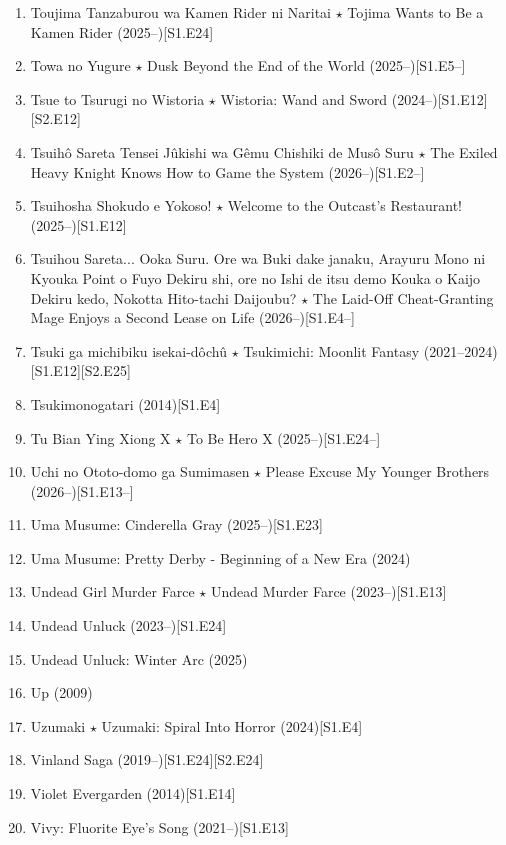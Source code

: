 \documentclass{article}
\begin{document}
\begin{enumerate}
    \item {\sc Toujima Tanzaburou wa Kamen Rider ni Naritai $\star$ Tojima Wants to Be a Kamen Rider} (2025--)\hfill[S1.E24]
    \item Towa no Yugure $\star$ Dusk Beyond the End of the World (2025--)\hfill[S1.E5--]
    \item {\sc Tsue to Tsurugi no Wistoria $\star$ Wistoria: Wand and Sword} (2024--)\hfill[S1.E12][S2.E12]
    \item Tsuihô Sareta Tensei Jûkishi wa Gêmu Chishiki de Musô Suru $\star$ The Exiled Heavy Knight Knows How to Game the System (2026--)\hfill[S1.E2--]
    \item {\sc Tsuihosha Shokudo e Yokoso! $\star$ Welcome to the Outcast's Restaurant!} (2025--)\hfill[S1.E12]
    \item Tsuihou Sareta... Ooka Suru. Ore wa Buki dake janaku, Arayuru Mono ni Kyouka Point o Fuyo Dekiru shi, ore no Ishi de itsu demo Kouka o Kaijo Dekiru kedo, Nokotta Hito-tachi Daijoubu? $\star$ The Laid-Off Cheat-Granting Mage Enjoys a Second Lease on Life (2026--)\hfill[S1.E4--]
    \item {\sc Tsuki ga michibiku isekai-dôchû $\star$ Tsukimichi: Moonlit Fantasy} (2021--2024)\hfill[S1.E12][S2.E25]
    \item {\sc Tsukimonogatari} (2014)\hfill[S1.E4]
    \item Tu Bian Ying Xiong X $\star$ To Be Hero X (2025--)\hfill[S1.E24--]
    \item Uchi no Ototo-domo ga Sumimasen $\star$ Please Excuse My Younger Brothers (2026--)\hfill[S1.E13--]
    \item {\sc Uma Musume: Cinderella Gray} (2025--)\hfill[S1.E23]    
    \item {\sc Uma Musume: Pretty Derby - Beginning of a New Era} (2024)
    \item {\sc Undead Girl Murder Farce $\star$ Undead Murder Farce} (2023--)\hfill[S1.E13]
    \item {\sc Undead Unluck} (2023--)\hfill[S1.E24]
    \item {\sc Undead Unluck: Winter Arc} (2025)
    \item {\sc Up} (2009)
    \item {\sc Uzumaki $\star$ Uzumaki: Spiral Into Horror} (2024)\hfill[S1.E4]
    \item {\sc Vinland Saga} (2019--)\hfill[S1.E24][S2.E24]
    \item {\sc Violet Evergarden} (2014)\hfill[S1.E14]
    \item {\sc Vivy: Fluorite Eye's Song} (2021--)\hfill[S1.E13]

\end{enumerate}
\end{document}
